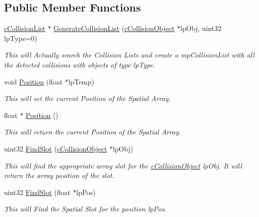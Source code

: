\subsection*{Public Member Functions}
\begin{DoxyCompactItemize}
\item 
\hyperlink{classc_collision_list}{cCollisionList} $\ast$ \hyperlink{classc_collision_handler_b_s_p_a3eefab2420c94920816fc63932140b5f}{GenerateCollisionList} (\hyperlink{classc_collision_object}{cCollisionObject} $\ast$lpObj, uint32 lpType=0)
\begin{DoxyCompactList}\small\item\em This will Actually search the Collision Lists and create a mpCollisionList with all the detected collisions with objects of type lpType. \item\end{DoxyCompactList}\item 
void \hyperlink{classc_collision_handler_b_s_p_a8fb831211d5d23d6a0ce1e77c1a011bf}{Position} (float $\ast$lpTemp)
\begin{DoxyCompactList}\small\item\em This will set the current Position of the Spatial Array. \item\end{DoxyCompactList}\item 
float $\ast$ \hyperlink{classc_collision_handler_b_s_p_a44158a68c715d0f4cd82e4f281554bfd}{Position} ()
\begin{DoxyCompactList}\small\item\em This will return the current Position of the Spatial Array. \item\end{DoxyCompactList}\item 
uint32 \hyperlink{classc_collision_handler_b_s_p_a9dfe5f431663f6e73fe9bac7f5225b6b}{FindSlot} (\hyperlink{classc_collision_object}{cCollisionObject} $\ast$lpObj)
\begin{DoxyCompactList}\small\item\em This will find the appropriate array slot for the \hyperlink{classc_collision_object}{cCollisionObject} lpObj. It will return the array position of the slot. \item\end{DoxyCompactList}\item 
uint32 \hyperlink{classc_collision_handler_b_s_p_a6aa114aa26cbac205816bf1338e04d82}{FindSlot} (float $\ast$lpPos)
\begin{DoxyCompactList}\small\item\em This will Find the Spatial Slot for the position lpPos. \item\end{DoxyCompactList}\item 

\end{DoxyCompactItemize}
